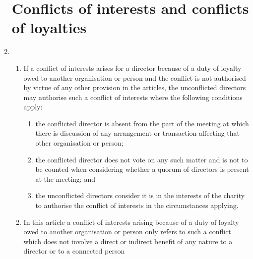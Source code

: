 \documentclass{article}
\begin{document}
\begin{enumerate}[label=\arabic*]
    \section{Conflicts of interests and conflicts of loyalties}
    \item \begin{enumerate}[label=(\arabic*)]
        \item If a conflict of interests arises for a director because of a duty of
        loyalty owed to another organisation or person and the conflict
        is not authorised by virtue of any other provision in the articles,
        the unconflicted directors may authorise such a conflict of
        interests where the following conditions apply:
        \begin{enumerate}[label=(\alph*)]
            \item the conflicted director is absent from the part of the
            meeting at which there is discussion of any arrangement
            or transaction affecting that other organisation or person;
            \item the conflicted director does not vote on any such matter
            and is not to be counted when considering whether a
            quorum of directors is present at the meeting; and
            \item the unconflicted directors consider it is in the interests
            of the charity to authorise the conflict of interests in the
            circumstances applying.
        \end{enumerate}
        \item In this article a conflict of interests arising because of a duty of
        loyalty owed to another organisation or person only refers to
        such a conflict which does not involve a direct or indirect benefit
        of any nature to a director or to a connected person
    \end{enumerate}
    

\end{enumerate}
\end{document}
